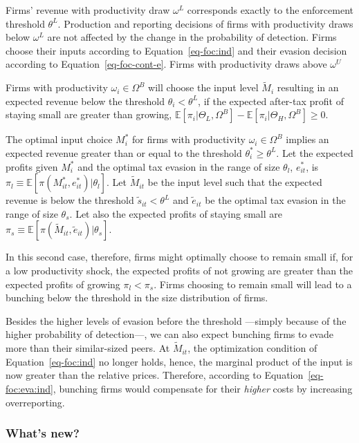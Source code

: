 \documentclass[
  12pt]{article}
\begin{document}
Firms' revenue with productivity draw \(\omega^L\) corresponds exactly
to the enforcement threshold \(\theta^L\). Production and reporting
decisions of firms with productivity draws below \(\omega^L\) are not
affected by the change in the probability of detection. Firms choose
their inputs according to Equation~\ref{eq-foc:ind} and their evasion
decision according to Equation~\ref{eq-foc-cont-e}. Firms with
productivity draws above \(\omega^U\)

Firms with productivity \(\omega_{i}\in \Omega^B\) will choose the input
level \(\tilde{M}_{i}\) resulting in an expected revenue below the
threshold \(\theta_{i}<\theta^L\), if the expected after-tax profit of
staying small are greater than growing,
\(\mathbb{E}[\pi_{i}|\Theta_L, \Omega^B]-\mathbb{E}[\pi_{i}|\Theta_H, \Omega^B]\ge0\).

The optimal input choice \(M^*_{i}\) for firms with productivity
\(\omega_i\in\Omega^B\) implies an expected revenue greater than or
equal to the threshold \(\theta^*_{i}\ge \theta^L\). Let the expected
profits given \(M^*_{i}\) and the optimal tax evasion in the range of
size \(\theta_l\), \(e^*_{it}\), is
\(\pi_l\equiv\mathbb{E}[\pi(M^*_{it}, e^*_{it})|\theta_l]\). Let
\(\tilde{M}_{it}\) be the input level such that the expected revenue is
below the threshold \(\tilde{s}_{it}<\theta^L\) and \(\tilde{e}_{it}\)
be the optimal tax evasion in the range of size \(\theta_s\). Let also
the expected profits of staying small are
\(\pi_s\equiv\mathbb{E}[\pi(\tilde{M}_{it},\tilde{e}_{it})|\theta_s]\).

In this second case, therefore, firms might optimally choose to remain
small if, for a low productivity shock, the expected profits of not
growing are greater than the expected profits of growing
\(\pi_l<\pi_s\). Firms choosing to remain small will lead to a bunching
below the threshold in the size distribution of firms.

Besides the higher levels of evasion before the threshold ---simply
because of the higher probability of detection---, we can also expect
bunching firms to evade more than their similar-sized peers. At
\(\tilde{M}_{it}\), the optimization condition of
Equation~\ref{eq-foc:ind} no longer holds, hence, the marginal product
of the input is now greater than the relative prices. Therefore,
according to Equation~\ref{eq-foc:eva:ind}, bunching firms would
compensate for their \emph{higher} costs by increasing overreporting.

\hypertarget{whats-new}{%
\subsubsection{What's new?}\label{whats-new}}
\end{document}
